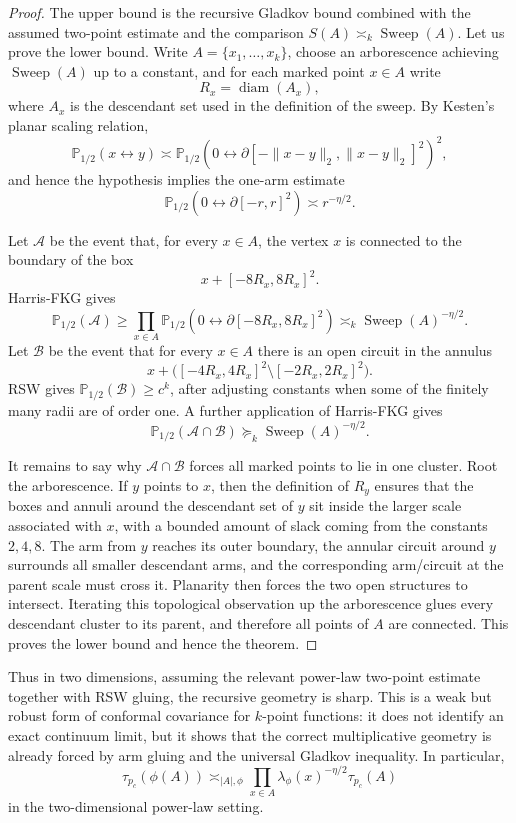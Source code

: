 \documentclass[11pt,reqno]{book}
\numberwithin{equation}{chapter}
\theoremstyle{plain}
\theoremstyle{definition}
\theoremstyle{remark}
\renewcommand{\P}{\mathbb P}
\newcommand{\1}{\mathbf 1}
\newcommand{\norm}[1]{\lVert #1\rVert}
\newcommand{\suc}{\succeq}
\begin{document}
\begin{proof}
The upper bound is the recursive Gladkov bound combined with the assumed
two-point estimate and the comparison \(S(A)\asymp_k\operatorname{Sweep}(A)\).
Let us prove the lower bound. Write \(A=\{x_1,\ldots,x_k\}\), choose an
arborescence achieving \(\operatorname{Sweep}(A)\) up to a constant, and for
each marked point \(x\in A\) write
\[
  R_x=\operatorname{diam}(A_x),
\]
where \(A_x\) is the descendant set used in the definition of the sweep. By
Kesten's planar scaling relation,
\[
  \P_{1/2}(x\leftrightarrow y)
  \asymp
  \P_{1/2}\!\left(0\leftrightarrow\partial[-\norm{x-y}_2,\norm{x-y}_2]^2\right)^2,
\]
and hence the hypothesis implies the one-arm estimate
\[
  \P_{1/2}(0\leftrightarrow\partial[-r,r]^2)
  \asymp r^{-\eta/2}.
\]

Let \(\mathscr A\) be the event that, for every \(x\in A\), the vertex \(x\)
is connected to the boundary of the box
\[
  x+[-8R_x,8R_x]^2.
\]
Harris-FKG gives
\[
  \P_{1/2}(\mathscr A)
  \geq
  \prod_{x\in A}
  \P_{1/2}\!\left(0\leftrightarrow\partial[-8R_x,8R_x]^2\right)
  \asymp_k
  \operatorname{Sweep}(A)^{-\eta/2}.
\]
Let \(\mathscr B\) be the event that for every \(x\in A\) there is an open
circuit in the annulus
\[
  x+\bigl([-4R_x,4R_x]^2\setminus[-2R_x,2R_x]^2\bigr).
\]
RSW gives \(\P_{1/2}(\mathscr B)\geq c^k\), after adjusting constants when
some of the finitely many radii are of order one. A further application of
Harris-FKG gives
\[
  \P_{1/2}(\mathscr A\cap\mathscr B)
  \suc_k
  \operatorname{Sweep}(A)^{-\eta/2}.
\]

It remains to say why \(\mathscr A\cap\mathscr B\) forces all marked points
to lie in one cluster. Root the arborescence. If \(y\) points to \(x\), then
the definition of \(R_y\) ensures that the boxes and annuli around the
descendant set of \(y\) sit inside the larger scale associated with \(x\),
with a bounded amount of slack coming from the constants \(2,4,8\). The arm
from \(y\) reaches its outer boundary, the annular circuit around \(y\)
surrounds all smaller descendant arms, and the corresponding arm/circuit at
the parent scale must cross it. Planarity then forces the two open
structures to intersect. Iterating this topological observation up the
arborescence glues every descendant cluster to its parent, and therefore all
points of \(A\) are connected. This proves the lower bound and hence the
theorem.
\end{proof}

Thus in two dimensions, assuming the relevant power-law two-point estimate
together with RSW gluing, the recursive geometry is sharp. This is a weak but
robust form of conformal covariance for \(k\)-point functions: it does not
identify an exact continuum limit, but it shows that the correct
multiplicative geometry is already forced by arm gluing and the universal
Gladkov inequality. In particular,
\[
  \tau_{p_c}(\phi(A))
  \asymp_{|A|,\phi}
  \prod_{x\in A}\lambda_\phi(x)^{-\eta/2}
  \tau_{p_c}(A)
\]
in the two-dimensional power-law setting.
\end{document}
